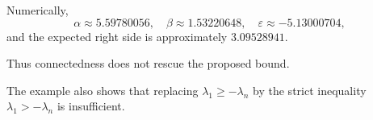 \documentclass[12pt]{article}
\theoremstyle{plain}
\newtheorem{lemma}[theorem]{Lemma}
\newtheorem{conjecture}[theorem]{Conjecture}
\newtheorem*{remark}{Remark}
\numberwithin{equation}{section}
\begin{document}
	Numerically,
	\[
	\alpha\approx5.59780056,
	\quad \beta\approx1.53220648,
	\quad \varepsilon\approx-5.13000704,
	\]
	and the expected right side is approximately $3.09528941$.
	
	Thus
	connectedness does not rescue the proposed bound.
	
	The example also shows that replacing $\lambda_1\geq-\lambda_n$ by the strict inequality $\lambda_1>-\lambda_n$ is insufficient.
	
	
	
	
	
	
	
		
	
\end{document}

